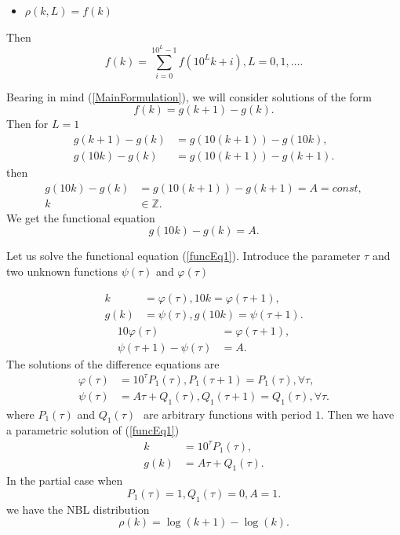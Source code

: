 \documentclass[titlepage,fleqn]{article}%
\providecommand{\U}[1]{\protect\rule{.1in}{.1in}}
\begin{document}
\begin{itemize}
\item $\rho(k,L)=f(k)$
\end{itemize}

Then%
\begin{equation}
f(k)=%
{\displaystyle\sum\limits_{i=0}^{10^{L}-1}}
f(10^{L}k+i),L=0,1,\ldots. \label{SolEq2}%
\end{equation}


Bearing in mind (\ref{MainFormulation}), we will consider solutions of the
form%
\begin{equation}
f(k)=g(k+1)-g(k). \label{Sdiff1}%
\end{equation}
Then for $L=1$
\begin{align*}
g(k+1)-g(k)  &  =g(10(k+1))-g(10k),\\
g(10k)-g(k)  &  =g(10(k+1))-g(k+1).
\end{align*}
then
\begin{align*}
g(10k)-g(k)  &  =g(10(k+1))-g(k+1)=A=const,\\
k  &  \in%
\mathbb{Z}
.
\end{align*}
We get the functional equation
\begin{equation}
g(10k)-g(k)=A. \label{funcEq1}%
\end{equation}


Let us solve the functional equation (\ref{funcEq1}). Introduce the parameter
$\tau$ and two unknown functions $\psi(\tau)$ and $\varphi(\tau)$%

\begin{align}
k  &  =\varphi(\tau),10k=\varphi(\tau+1),\label{Fun1}\\
g(k)  &  =\psi(\tau),g(10k)=\psi(\tau+1).\nonumber
\end{align}%
\begin{align}
10\varphi(\tau)  &  =\varphi(\tau+1),\label{Fun2}\\
\psi(\tau+1)-\psi(\tau)  &  =A.\nonumber
\end{align}
The solutions of the difference equations are%
\begin{align*}
\varphi(\tau)  &  =10^{\tau}P_{1}(\tau),P_{1}(\tau+1)=P_{1}(\tau),\forall
\tau,\\
\psi(\tau)  &  =A\tau+Q_{1}(\tau),Q_{1}(\tau+1)=Q_{1}(\tau),\forall\tau.
\end{align*}
where $P_{1}(\tau)$ and $Q_{1}(\tau)\ $\ are arbitrary functions with period
$1$. Then we have a parametric solution of (\ref{funcEq1})%
\begin{align}
k  &  =10^{\tau}P_{1}(\tau),\label{Param1}\\
g(k)  &  =A\tau+Q_{1}(\tau).\nonumber
\end{align}
In the partial case when
\[
P_{1}(\tau)=1,Q_{1}(\tau)=0,A=1.
\]
we have the NBL distribution%
\begin{equation}
\rho(k)=\log(k+1)-\log(k).
\end{equation}
\end{document}

